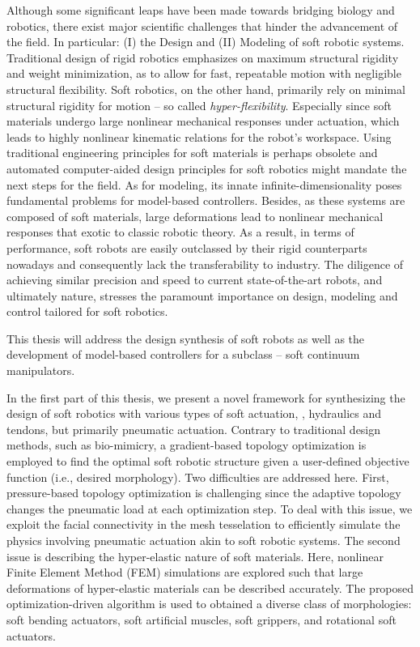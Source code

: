 \par Although some significant leaps have been made towards bridging biology and robotics, there exist major scientific challenges that hinder the advancement of the field. In particular: (I) the Design and (II) Modeling of soft robotic systems. Traditional design of rigid robotics emphasizes on maximum structural rigidity and weight minimization, as to allow for fast, repeatable motion with negligible structural flexibility. Soft robotics, on the other hand, primarily rely on minimal structural rigidity for motion -- so called \emph{hyper-flexibility}. Especially since soft materials undergo large nonlinear mechanical responses under actuation, which leads to highly nonlinear kinematic relations for the robot's workspace. Using traditional engineering principles for soft materials is perhaps obsolete and automated computer-aided design principles for soft robotics might mandate the next steps for the field.
As for modeling, its innate infinite-dimensionality poses fundamental problems for model-based controllers. Besides, as these systems are composed of soft materials, large deformations lead to nonlinear mechanical responses that exotic to classic robotic theory. As a result, in terms of performance, soft robots are easily outclassed by their rigid counterparts nowadays and consequently lack the transferability to industry. The diligence of achieving similar precision and speed to current state-of-the-art robots, and ultimately nature, stresses the paramount importance on design, modeling and control tailored for soft robotics.

\par This thesis will address the design synthesis of soft robots as well as the development of model-based controllers for a subclass  -- soft continuum manipulators.

\par In the first part of this thesis, we present a novel framework for synthesizing the design of soft robotics with various types of soft actuation, \eg, hydraulics and tendons, but primarily pneumatic actuation. Contrary to traditional design methods, such as bio-mimicry, a gradient-based topology optimization is employed to find the optimal soft robotic structure given a user-defined objective function (i.e., desired morphology). Two difficulties are addressed here. First, pressure-based topology optimization is challenging since the adaptive topology changes the pneumatic load at each optimization step. To deal with this issue, we exploit the facial connectivity in the mesh tesselation to efficiently simulate the physics involving pneumatic actuation akin to soft robotic systems. The second issue is describing the hyper-elastic nature of soft materials. Here, nonlinear Finite Element Method (FEM) simulations are explored such that large deformations of hyper-elastic materials can be described accurately. The proposed optimization-driven algorithm is used to obtained a diverse class of morphologies: soft bending actuators, soft artificial muscles, soft grippers, and rotational soft actuators.

